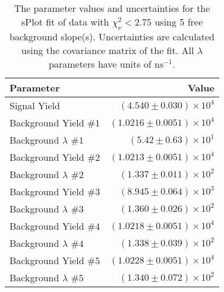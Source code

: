 
\begin{table}
    \begin{center}
        \begin{tabular}{lr}\toprule
            Parameter & Value \\\midrule
            Signal Yield & $(4.540 \pm 0.030) \times 10^{4}$ \\
            Background Yield $\#1$ & $(1.0216 \pm 0.0051) \times 10^{4}$ \\
            Background $\lambda$ $\#1$ & $(5.42 \pm 0.63) \times 10^{1}$ \\
            Background Yield $\#2$ & $(1.0213 \pm 0.0051) \times 10^{4}$ \\
            Background $\lambda$ $\#2$ & $(1.337 \pm 0.011) \times 10^{2}$ \\
            Background Yield $\#3$ & $(8.945 \pm 0.064) \times 10^{3}$ \\
            Background $\lambda$ $\#3$ & $(1.360 \pm 0.026) \times 10^{2}$ \\
            Background Yield $\#4$ & $(1.0218 \pm 0.0051) \times 10^{4}$ \\
            Background $\lambda$ $\#4$ & $(1.338 \pm 0.039) \times 10^{2}$ \\
            Background Yield $\#5$ & $(1.0228 \pm 0.0051) \times 10^{4}$ \\
            Background $\lambda$ $\#5$ & $(1.340 \pm 0.072) \times 10^{2}$ \\\bottomrule
        \end{tabular}
        \caption{The parameter values and uncertainties for the sPlot fit of data with $\chi^2_\nu < 2.75$ using 5 free background slope(s). Uncertainties are calculated using the covariance matrix of the fit. All $\lambda$ parameters have units of $\si{\nano\second}^{-1}$.}
    \end{center}
\end{table}

